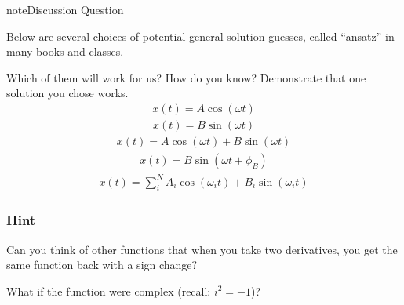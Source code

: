 \documentclass[letterpaper,10pt,english]{jupyterBook}
\begin{document}
\begin{sphinxadmonition}{note}{Discussion Question}

\sphinxAtStartPar
Below are several choices of potential general solution guesses, called “ansatz” in many books and classes.

\sphinxAtStartPar
Which of them will work for us? How do you know? Demonstrate that one solution you chose works.
\begin{equation*}
\begin{split}x(t) = A\cos(\omega t)\end{split}
\end{equation*}\begin{equation*}
\begin{split}x(t) = B\sin(\omega t)\end{split}
\end{equation*}\begin{equation*}
\begin{split}x(t) = A\cos(\omega t)+B\sin(\omega t)\end{split}
\end{equation*}\begin{equation*}
\begin{split}x(t) = B\sin(\omega t+ \phi_B)\end{split}
\end{equation*}\begin{equation*}
\begin{split}x(t) = \sum_i^N A_i\cos(\omega_i t) + B_i\sin(\omega_i t)\end{split}
\end{equation*}
\sphinxAtStartPar
{}
\end{sphinxadmonition}
\subsubsection*{Hint}

\sphinxAtStartPar
Can you think of other functions that when you take two derivatives, you get the same function back with a sign change?

\sphinxAtStartPar
What if the function were complex (recall: \(i^2 = -1\))?
\end{document}
